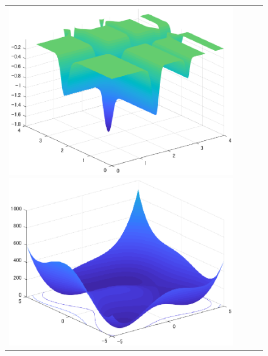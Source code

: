 \documentclass{jarticle}
\begin{document}
\begin{figure}[h]
\begin{tabular}{cccc}
\begin{minipage}{0.24\hsize}
\centering
\includegraphics[width=1.0\linewidth]{eps/3d_michalewicz.eps}
\caption{}
\label{fig:3d_michalewicz}
\end{minipage} 

\begin{minipage}{0.24\hsize}
\centering
\includegraphics[width=1.0\linewidth]{eps/3d_himmelblau.eps}
\caption{}
\label{fig:3d_himmelblau}
\end{minipage}\\


\end{tabular}
\end{figure}
\end{document}
